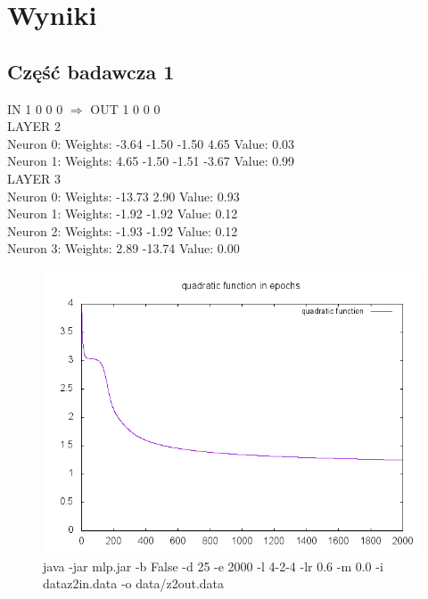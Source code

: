 \documentclass{classrep}
\begin{document}
\newpage
\section{Wyniki}
{
\subsection{Część badawcza 1} 

IN 1 0 0 0 $\Rightarrow$ OUT 1 0 0 0\\
LAYER 2\\
Neuron 0: Weights: -3.64 -1.50 -1.50 4.65 Value: 0.03\\
Neuron 1: Weights: 4.65 -1.50 -1.51 -3.67 Value: 0.99 \\
LAYER 3 \\
Neuron 0: Weights: -13.73 2.90 Value: 0.93\\
Neuron 1: Weights: -1.92 -1.92 Value: 0.12 \\
Neuron 2: Weights: -1.93 -1.92 Value: 0.12 \\
Neuron 3: Weights: 2.89 -13.74  Value: 0.00 \\

\begin{figure}[h!]
 \centering
 \includegraphics[width=12cm]{img/424biasfalse.png}
 \vspace{-0.3cm}
 \caption{java -jar mlp.jar -b False -d 25 -e 2000 -l 4-2-4 -lr 0.6 -m 0.0 -i dataz2in.data -o data/z2out.data }
\end{figure}

}
\end{document}
